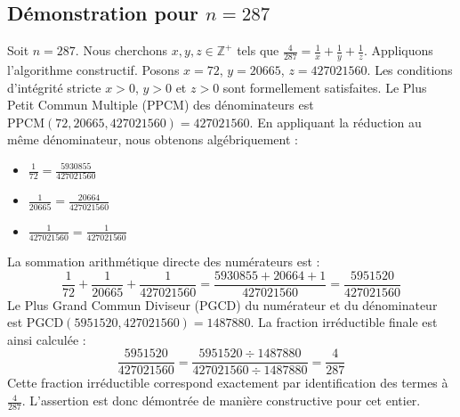 \documentclass[11pt,a4paper]{article}
\begin{document}
\subsection{Démonstration pour $n = 287$}
Soit $n = 287$. Nous cherchons $x, y, z \in \mathbb{Z}^{+}$ tels que $\frac{4}{287} = \frac{1}{x} + \frac{1}{y} + \frac{1}{z}$.
Appliquons l'algorithme constructif. Posons $x = 72$, $y = 20665$, $z = 427021560$.
Les conditions d'intégrité stricte $x > 0$, $y > 0$ et $z > 0$ sont formellement satisfaites.
Le Plus Petit Commun Multiple (PPCM) des dénominateurs est $\text{PPCM}(72, 20665, 427021560) = 427021560$.
En appliquant la réduction au même dénominateur, nous obtenons algébriquement :
\begin{itemize}
    \item $\frac{1}{72} = \frac{5930855}{427021560}$
    \item $\frac{1}{20665} = \frac{20664}{427021560}$
    \item $\frac{1}{427021560} = \frac{1}{427021560}$
\end{itemize}
La sommation arithmétique directe des numérateurs est :
$$ \frac{1}{72} + \frac{1}{20665} + \frac{1}{427021560} = \frac{5930855 + 20664 + 1}{427021560} = \frac{5951520}{427021560} $$
Le Plus Grand Commun Diviseur (PGCD) du numérateur et du dénominateur est $\text{PGCD}(5951520, 427021560) = 1487880$.
La fraction irréductible finale est ainsi calculée :
$$ \frac{5951520}{427021560} = \frac{5951520 \div 1487880}{427021560 \div 1487880} = \frac{4}{287} $$
Cette fraction irréductible correspond exactement par identification des termes à $\frac{4}{287}$. L'assertion est donc démontrée de manière constructive pour cet entier.
\end{document}
